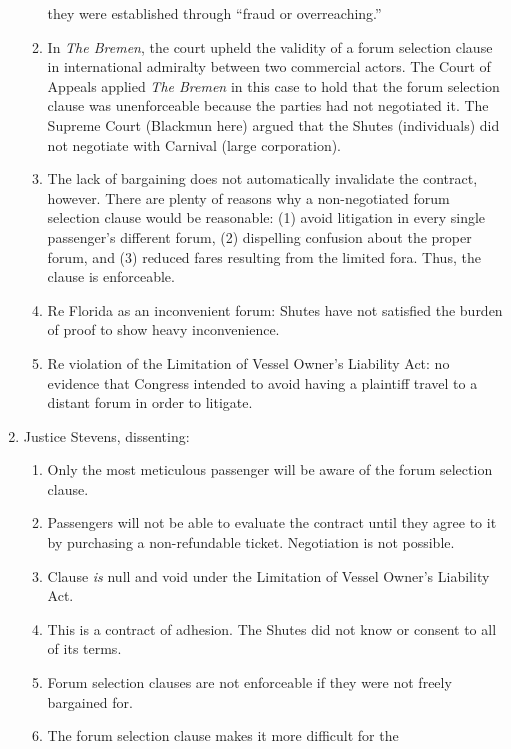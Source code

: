 \begin{enumerate}
\begin{enumerate}
        they were established through ``fraud or overreaching.''
        \item In \emph{The Bremen}, the court upheld the validity of a forum 
        selection clause in international admiralty between two commercial 
        actors. The Court of Appeals applied \emph{The Bremen} in this case to 
        hold that the forum selection clause was unenforceable because the 
        parties had not negotiated it. The Supreme Court (Blackmun here) 
        argued that the Shutes (individuals) did not negotiate with Carnival 
        (large corporation).
        \item The lack of bargaining does not automatically invalidate the 
        contract, however. There are plenty of reasons why a non-negotiated 
        forum selection clause would be reasonable: (1) avoid litigation in 
        every single passenger's different forum, (2) dispelling confusion 
        about the proper forum, and (3) reduced fares resulting from the 
        limited fora.  Thus, the clause is enforceable.
        \item Re Florida as an inconvenient forum: Shutes have not satisfied 
        the burden of proof to show heavy inconvenience.
        \item Re violation of the Limitation of Vessel Owner's Liability Act: 
        no evidence that Congress intended to avoid having a plaintiff travel 
        to a distant forum in order to litigate.
    \end{enumerate}
    \item Justice Stevens, dissenting:
    \begin{enumerate}
        \item Only the most meticulous passenger will be aware of the forum 
        selection clause.
        \item Passengers will not be able to evaluate the contract until they 
        agree to it by purchasing a non-refundable ticket. Negotiation is not 
        possible.
        \item Clause \emph{is} null and void under the Limitation of Vessel 
        Owner's Liability Act.
        \item This is a contract of adhesion. The Shutes did not know or 
        consent to all of its terms.
        \item Forum selection clauses are not enforceable if they were not 
        freely bargained for.
        \item The forum selection clause makes it more difficult for the 

\end{enumerate}
\end{enumerate}
